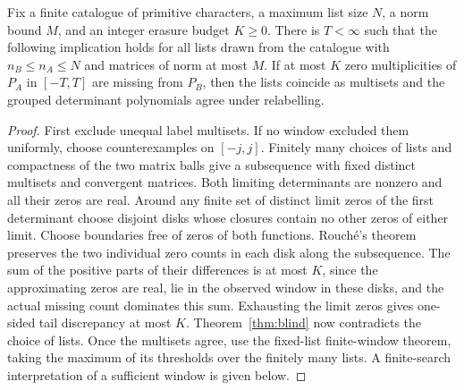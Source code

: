 \begin{corollary}\label{cor:blind-finite}
Fix a finite catalogue of primitive characters, a maximum list size $N$, a norm bound $M$, and an integer erasure budget $K\ge0$. There is $T<\infty$ such that the following implication holds for all lists drawn from the catalogue with $n_B\le n_A\le N$ and matrices of norm at most $M$. If at most $K$ zero multiplicities of $P_A$ in $[-T,T]$ are missing from $P_B$, then the lists coincide as multisets and the grouped determinant polynomials agree under relabelling.
\end{corollary}
\begin{proof}
First exclude unequal label multisets. If no window excluded them uniformly, choose counterexamples on $[-j,j]$. Finitely many choices of lists and compactness of the two matrix balls give a subsequence with fixed distinct multisets and convergent matrices. Both limiting determinants are nonzero and all their zeros are real. Around any finite set of distinct limit zeros of the first determinant choose disjoint disks whose closures contain no other zeros of either limit. Choose boundaries free of zeros of both functions. Rouch\'e's theorem preserves the two individual zero counts in each disk along the subsequence. The sum of the positive parts of their differences is at most $K$, since the approximating zeros are real, lie in the observed window in these disks, and the actual missing count dominates this sum. Exhausting the limit zeros gives one-sided tail discrepancy at most $K$. Theorem~\ref{thm:blind} now contradicts the choice of lists. Once the multisets agree, use the fixed-list finite-window theorem, taking the maximum of its thresholds over the finitely many lists. A finite-search interpretation of a sufficient window is given below.
\end{proof}
